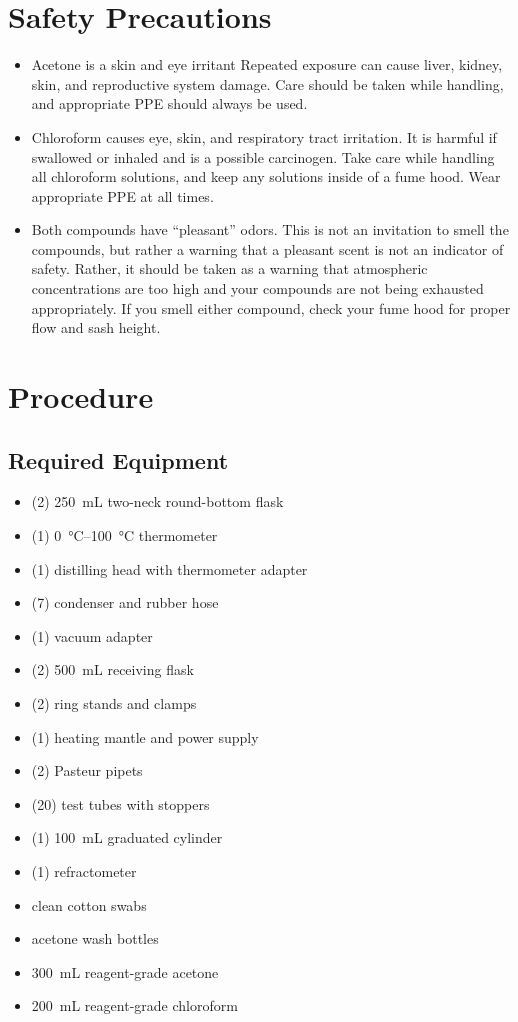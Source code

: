 \section{Safety Precautions}
\label{sec:safety}

\begin{itemize}
	\item Acetone is a skin and eye irritant Repeated exposure can cause liver, kidney, skin, and reproductive system damage. Care should be taken while handling, and appropriate PPE should always be used. 
	\item Chloroform causes eye, skin, and respiratory tract irritation. It is harmful if swallowed or inhaled and is a possible carcinogen. Take care while handling all chloroform solutions, and keep any solutions inside of a fume hood. Wear appropriate PPE at all times. 
	\item Both compounds have ``pleasant'' odors. This is not an invitation to smell the compounds, but rather a warning that a pleasant scent is not an indicator of safety. Rather, it should be taken as a warning that atmospheric concentrations are too high and your compounds are not being exhausted appropriately. If you smell either compound, check your fume hood for proper flow and sash height. 
\end{itemize}

\section{Procedure}
\label{sec:procedure}

\subsection{Required Equipment}
\label{subs:required_equipment}

\begin{itemize}
	\item (2) \qty{250}{\mL} two-neck round-bottom flask
	\item (1) \qtyrange{0}{100}{\celsius} thermometer
	\item (1) distilling head with thermometer adapter
	\item (7) condenser and rubber hose
	\item (1) vacuum adapter
	\item (2) \qty{500}{\mL} receiving flask
	\item (2) ring stands and clamps
	\item (1) heating mantle and power supply
	\item (2) Pasteur pipets
	\item (20) test tubes with stoppers
	\item (1) \qty{100}{\mL} graduated cylinder
	\item (1) refractometer
	\item clean cotton swabs
	\item acetone wash bottles
	\item \qty{300}{\mL} reagent-grade acetone
	\item \qty{200}{\mL} reagent-grade chloroform
\end{itemize}

